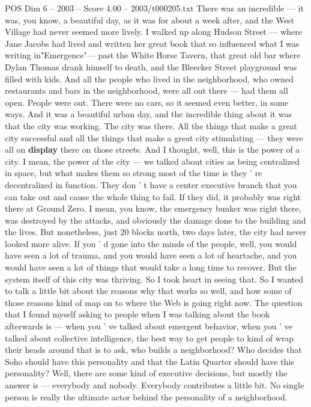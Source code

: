 \begin{textsample}{POS Dim 6 – 2003 – Score 4.00 – 2003/t000205.txt}
There was an incredible — it was, you know, a beautiful day, as it was for about a week after, and the West Village had never seemed more lively.
I walked up along Hudson Street — where Jane Jacobs had lived and written her great book that so influenced what I was writing in"Emergence"— past the White Horse Tavern, that great old bar where Dylan Thomas drank himself to death, and the Bleecker Street playground was filled with kids.
And all the people who lived in the neighborhood, who owned restaurants and bars in the neighborhood, were all out there — had them all open.
People were out.
There were no cars, so it seemed even better, in some ways.
And it was a beautiful urban day, and the incredible thing about it was that the city was working.
The city was there.
All the things that make a great city successful and all the things that make a great city stimulating — they were all on \textbf{display} there on those streets.
And I thought, well, this is the power of a city.
I mean, the power of the city — we talked about cities as being centralized in space, but what makes them so strong most of the time is they ' re decentralized in function.
They don ' t have a center executive branch that you can take out and cause the whole thing to fail.
If they did, it probably was right there at Ground Zero.
I mean, you know, the emergency bunker was right there, was destroyed by the attacks, and obviously the damage done to the building and the lives.
But nonetheless, just 20 blocks north, two days later, the city had never looked more alive.
If you ' d gone into the minds of the people, well, you would have seen a lot of trauma, and you would have seen a lot of heartache, and you would have seen a lot of things that would take a long time to recover.
But the system itself of this city was thriving.
So I took heart in seeing that.
So I wanted to talk a little bit about the reasons why that works so well, and how some of those reasons kind of map on to where the Web is going right now.
The question that I found myself asking to people when I was talking about the book afterwards is — when you ' ve talked about emergent behavior, when you ' ve talked about collective intelligence, the best way to get people to kind of wrap their heads around that is to ask, who builds a neighborhood?
Who decides that Soho should have this personality and that the Latin Quarter should have this personality?
Well, there are some kind of executive decisions, but mostly the answer is — everybody and nobody.
Everybody contributes a little bit.
No single person is really the ultimate actor behind the personality of a neighborhood.

\end{textsample}
